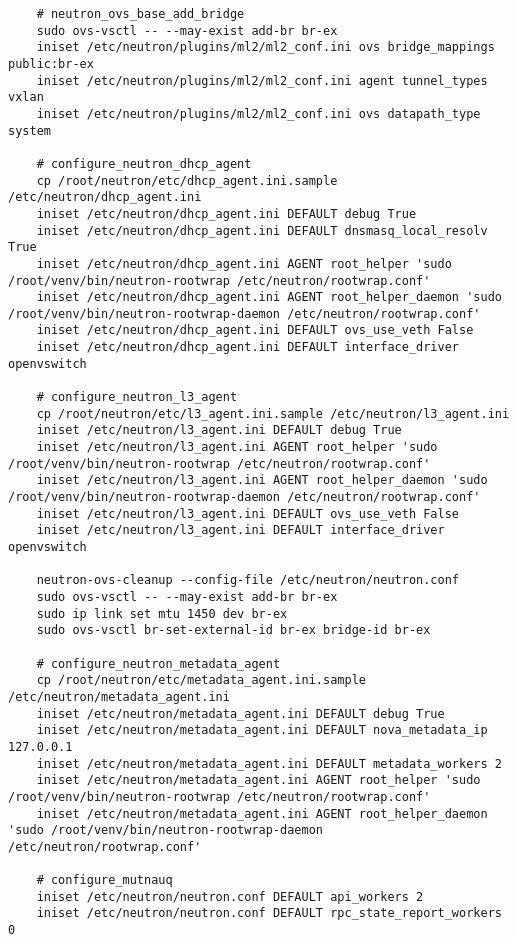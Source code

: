 \documentclass[a4paper,left=1.5cm,right=1.5cm,11pt]{article}
\begin{document}
\begin{lstlisting}
	# neutron_ovs_base_add_bridge
	sudo ovs-vsctl -- --may-exist add-br br-ex
	iniset /etc/neutron/plugins/ml2/ml2_conf.ini ovs bridge_mappings public:br-ex
	iniset /etc/neutron/plugins/ml2/ml2_conf.ini agent tunnel_types vxlan
	iniset /etc/neutron/plugins/ml2/ml2_conf.ini ovs datapath_type system

	# configure_neutron_dhcp_agent
	cp /root/neutron/etc/dhcp_agent.ini.sample /etc/neutron/dhcp_agent.ini
	iniset /etc/neutron/dhcp_agent.ini DEFAULT debug True
	iniset /etc/neutron/dhcp_agent.ini DEFAULT dnsmasq_local_resolv True
	iniset /etc/neutron/dhcp_agent.ini AGENT root_helper 'sudo /root/venv/bin/neutron-rootwrap /etc/neutron/rootwrap.conf'
	iniset /etc/neutron/dhcp_agent.ini AGENT root_helper_daemon 'sudo /root/venv/bin/neutron-rootwrap-daemon /etc/neutron/rootwrap.conf'
	iniset /etc/neutron/dhcp_agent.ini DEFAULT ovs_use_veth False
	iniset /etc/neutron/dhcp_agent.ini DEFAULT interface_driver openvswitch

	# configure_neutron_l3_agent
	cp /root/neutron/etc/l3_agent.ini.sample /etc/neutron/l3_agent.ini
	iniset /etc/neutron/l3_agent.ini DEFAULT debug True
	iniset /etc/neutron/l3_agent.ini AGENT root_helper 'sudo /root/venv/bin/neutron-rootwrap /etc/neutron/rootwrap.conf'
	iniset /etc/neutron/l3_agent.ini AGENT root_helper_daemon 'sudo /root/venv/bin/neutron-rootwrap-daemon /etc/neutron/rootwrap.conf'
	iniset /etc/neutron/l3_agent.ini DEFAULT ovs_use_veth False
	iniset /etc/neutron/l3_agent.ini DEFAULT interface_driver openvswitch

	neutron-ovs-cleanup --config-file /etc/neutron/neutron.conf
	sudo ovs-vsctl -- --may-exist add-br br-ex
	sudo ip link set mtu 1450 dev br-ex
	sudo ovs-vsctl br-set-external-id br-ex bridge-id br-ex

	# configure_neutron_metadata_agent
	cp /root/neutron/etc/metadata_agent.ini.sample /etc/neutron/metadata_agent.ini
	iniset /etc/neutron/metadata_agent.ini DEFAULT debug True
	iniset /etc/neutron/metadata_agent.ini DEFAULT nova_metadata_ip 127.0.0.1
	iniset /etc/neutron/metadata_agent.ini DEFAULT metadata_workers 2
	iniset /etc/neutron/metadata_agent.ini AGENT root_helper 'sudo /root/venv/bin/neutron-rootwrap /etc/neutron/rootwrap.conf'
	iniset /etc/neutron/metadata_agent.ini AGENT root_helper_daemon 'sudo /root/venv/bin/neutron-rootwrap-daemon /etc/neutron/rootwrap.conf'

	# configure_mutnauq
	iniset /etc/neutron/neutron.conf DEFAULT api_workers 2
	iniset /etc/neutron/neutron.conf DEFAULT rpc_state_report_workers 0


\end{lstlisting}
\end{document}
